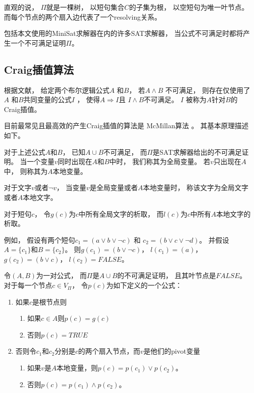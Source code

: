 直观的说，
$\Pi$就是一棵树，
以短句集合$C$的子集为根，
以空短句为唯一叶节点。
而每个节点的两个扇入边代表了一个resolving关系。

包括本文使用的MiniSat求解器在内的许多SAT求解器，
当公式不可满足时都将产生一个不可满足证明$\Pi$。

\subsection{Craig插值算法}

根据文献，
给定两个布尔逻辑公式$A$ 和$B$，
若$A\wedge B$ 不可满足，
则存在仅使用了$A$ 和$B$共同变量的公式$I$ ，
使得$A\Rightarrow I$且
$I\wedge B$不可满足。
$I$ 被称为$A$针对$B$的Craig插值。

目前最常见且最高效的产生Craig插值的算法是
McMillan算法 。
其基本原理描述如下。

对于上述公式$A$和$B$，
已知$A\cup B$不可满足，
而$\Pi$是SAT求解器给出的不可满足证明。
当一个变量$v$同时出现在$A$和$B$中时，
我们称其为全局变量。
若$v$只出现在$A$中，
则称其为$A$本地变量。

对于文字$v$或者$\neg v$，
当变量$v$是全局变量或者$A$本地变量时，
称该文字为全局文字或者$A$本地文字。

对于短句$c$，
令$g(c)$为$c$中所有全局文字的析取，
而$l(c)$为$c$中所有$A$本地文字的析取。

例如，
假设有两个短句$c_1=(a\vee b\vee\neg c)$ 和
$c_2=(b\vee c\vee\neg d)$。
并假设$A=\{c_1\}$和$B=\{c_2\}$。
则$g(c_1)=(b\vee\neg c)$，
$l(c_1)=(a)$，
$g(c_2)=(b\vee c)$，
$l(c_2)=FALSE$。


\begin{definition}\label{def_gencraig}
令$(A,B)$为一对公式，
而$\Pi$是$A\cup B$的不可满足证明，
且其叶节点是$FALSE$。
对于每一个节点$c\in V_{\Pi}$，
令$p(c)$为如下定义的一个公式：
\begin{enumerate}
\item 如果$c$是根节点则
  \begin{enumerate}
    \item 如果$c\in A$则$p(c)=g(c)$
    \item 否则$p(c)=TRUE$
  \end{enumerate}
\item 否则令$c_1$和$c_2$分别是$c$的两个扇入节点，而$v$是他们的pivot变量
  \begin{enumerate}
    \item 如果$v$是$A$本地变量，则$p(c)=p(c_1)\vee p(c_2)$。
    \item 否则$p(c)=p(c_1)\wedge p(c_2)$。
  \end{enumerate}
\end{enumerate}
\end{definition}

